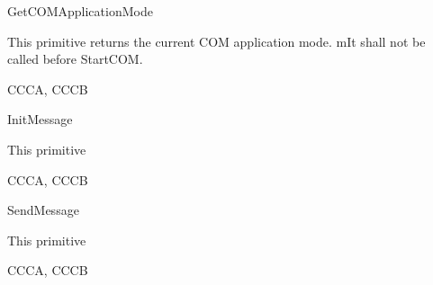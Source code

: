 \begin{function}{GetCOMApplicationMode}
  \begin{fundescription}
    This primitive returns the current COM application mode. 
    mIt shall not be called before StartCOM.
  \end{fundescription}
  \begin{funparameters}
  \end{funparameters}
  \begin{funreturn}
  \end{funreturn}
  \begin{funconformance}
    CCCA, CCCB
  \end{funconformance}
\end{function}

\begin{function}{InitMessage}
  \begin{fundescription}
    This primitive 
  \end{fundescription}
  \begin{funparameters}
  \end{funparameters}
  \begin{funreturn}
  \end{funreturn}
  \begin{funconformance}
    CCCA, CCCB
  \end{funconformance}
\end{function}

\begin{function}{SendMessage}
  \begin{fundescription}
    This primitive 
  \end{fundescription}
  \begin{funparameters}
  \end{funparameters}
  \begin{funreturn}
  \end{funreturn}
  \begin{funconformance}
    CCCA, CCCB
  \end{funconformance}
\end{function}

